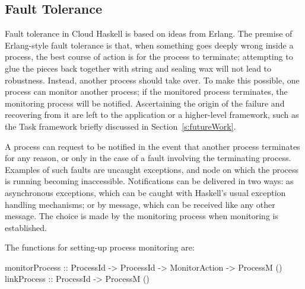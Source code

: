 \documentclass[preprint]{sigplanconf}
\begin{document}


\subsection{Fault Tolerance}
\label{FaultTolerance}
Fault tolerance in Cloud Haskell is based on ideas from Erlang. 
%
The premise of Erlang-style fault tolerance is that, when something goes deeply wrong inside a process, the best course of action is for the process to terminate; attempting to glue the pieces back together with string and sealing wax will not lead to robustness.   Instead, another process should take over.  
To make this possible, one process can monitor another process; if the monitored process terminates, the monitoring process will be notified. 
Ascertaining the origin of the failure and recovering from it are left to the application or a higher-level framework, such as the Task framework briefly discussed in Section~\ref{s:futureWork}.

A process can request to be notified in the event that another process terminates for any reason, or only in the case of a fault involving the terminating process.
Examples of such faults are uncaught exceptions, and node on which the process is running becoming inaccessible. 
Notifications can be delivered in two ways: as asynchronous exceptions, which can be caught with Haskell's usual exception handling mechanisms; or by message, which can be received like any other message.
The choice is made by the monitoring process when monitoring is established.

The functions for setting-up process monitoring are:

\begin{code}
monitorProcess :: ProcessId -> ProcessId
               		-> MonitorAction -> ProcessM ()
linkProcess    :: ProcessId -> ProcessM ()
\end{code}
\end{document}
